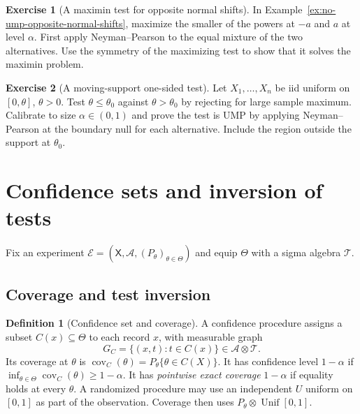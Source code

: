 \documentclass[11pt,oneside]{book}
\theoremstyle{definition}
\newtheorem{definition}[theorem]{Definition}
\newtheorem{exercise}{Exercise}[section]
\theoremstyle{remark}
\begin{document}
\begin{exercise}[A maximin test for opposite normal shifts]
\label{exer:np-maximin-opposite-shifts}
In Example~\ref{ex:no-ump-opposite-normal-shifts}, maximize the
smaller of the powers at $-a$ and $a$ at level $\alpha$.
First apply Neyman--Pearson to the equal mixture of the two
alternatives. Use the symmetry of the maximizing test to show
that it solves the maximin problem.
\end{exercise}

\begin{exercise}[A moving-support one-sided test]
\label{exer:np-uniform-one-sided}
Let $X_1,\ldots,X_n$ be iid uniform on $[0,\theta]$, $\theta>0$.
Test $\theta\leq\theta_0$ against $\theta>\theta_0$ by rejecting
for large sample maximum. Calibrate to size $\alpha\in(0,1)$
and prove the test is UMP by applying Neyman--Pearson at the
boundary null for each alternative. Include the region outside
the support at $\theta_0$.
\end{exercise}



\clearpage
\section{Confidence sets and inversion of tests}
\label{sec:confidence-sets-test-inversion}

Fix an experiment $\mathcal E=(\mathsf X,\mathcal A,
(P_\theta)_{\theta\in\Theta})$ and equip $\Theta$ with a
sigma algebra $\mathcal T$.

\subsection{Coverage and test inversion}
\label{subsec:confidence-coverage-inversion}

\begin{definition}[Confidence set and coverage]
\label{def:confidence-set-coverage}
A confidence procedure assigns a subset $C(x)\subseteq\Theta$ to
each record $x$, with measurable graph
\[
G_C=\{(x,t):t\in C(x)\}\in\mathcal A\otimes\mathcal T .
\]
Its coverage at $\theta$ is
$\operatorname{cov}_C(\theta)=P_\theta\{\theta\in C(X)\}$.
It has confidence level $1-\alpha$ if
$\inf_{\theta\in\Theta}\operatorname{cov}_C(\theta)\geq1-\alpha$.
It has \emph{pointwise exact coverage} $1-\alpha$ if equality
holds at every $\theta$. A randomized procedure may use an
independent $U$ uniform on $[0,1]$ as part of the observation.
Coverage then uses $P_\theta\otimes\operatorname{Unif}[0,1]$.
\end{definition}
\end{document}

